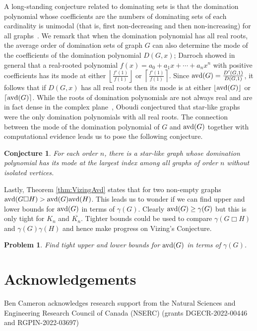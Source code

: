\documentclass[11pt]{article}
\newtheorem{problem}{Problem}
\newtheorem{conjecture}[definition]{Conjecture}
\newcommand{\avd}{\text{\rm{avd}}}
\begin{document}
%
%



A long-standing conjecture related to dominating sets is that the domination polynomial whose coefficients are the numbers of dominating sets of each cardinality is unimodal (that is, first non-decreasing and then non-increasing) for all graphs~\cite{2014Alikhani}.
We remark that when the domination polynomial has all real roots, the average order of domination sets of graph $G$ can also determine the mode of the coefficients of the domination polynomial $D(G,x)$; Darroch \cite{1964Darroch} showed in general that a real-rooted polynomial $f(x) = a_0 + a_1x + \cdots + a_nx^n$ with positive coefficients has its mode at either $\left\lfloor \frac{f'(1)}{f(1)} \right\rfloor$ or $\left\lceil \frac{f'(1)}{f(1)} \right\rceil$. Since $\avd(G) = \frac{D'(G,1)}{D(G,1)}$, it follows that if $D(G,x)$ has all real roots then its mode is at either $\left\lfloor \avd(G) \right\rfloor$ or $\left\lceil \avd(G) \right\rceil$. While the roots of domination polynomials are not always real and are in fact dense in the complex plane~\cite{2014BrownTufts}, Oboudi \cite{2015Oboudi} conjectured that star-like graphs were the only domination polynomials with all real roots. The connection between the mode of the domination polynomial of $G$ and $\avd(G)$ together with computational evidence leads us to pose the following conjecture.

\begin{conjecture}
For each order $n$, there is a star-like graph whose domination polynomial has its mode at the largest index among all graphs of order $n$ without isolated vertices.
\end{conjecture}


Lastly, Theorem  \ref{thm:VizingAvd} states that for two non-empty graphs $\avd(G \Box H) > \avd(G)\avd(H)$. This leads us to wonder if we can find upper and lower bounds for $\avd(G)$ in terms of $\gamma(G)$. Clearly $\avd(G) \geq \gamma(G)$ but this is only tight for $K_n$ and $\overline{K_n}$. Tighter bounds could be used to compare $\gamma(G \Box H)$ and  $\gamma(G)\gamma(H)$ and hence make progress on Vizing's Conjecture.

\begin{problem}
Find tight upper and lower bounds for $\avd(G)$ in terms of $\gamma(G)$.
\end{problem}



\section*{Acknowledgements}
 
\noindent Ben Cameron acknowledges research support from the Natural Sciences and Engineering Research Council of Canada (NSERC) (grants DGECR-2022-00446 and RGPIN-2022-03697)





\end{document}
